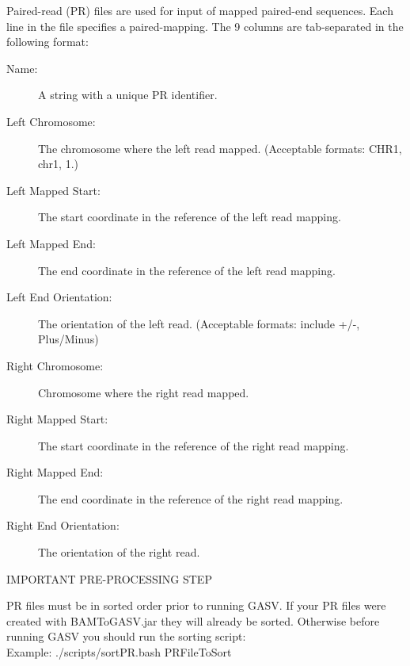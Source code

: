 \documentclass[11pt]{article}
\begin{document}
Paired-read (PR) files are used for input of mapped
paired-end sequences. Each line in the file specifies a paired-mapping.  The 9 columns are tab-separated in the following format:

\begin{framed}
\begin{description}
\item[Name:]                    A string with a unique PR identifier.

\item[Left Chromosome:]        The chromosome where the left read mapped.
                        (Acceptable formats: CHR1, chr1, 1.)

\item[Left Mapped Start:]      The start coordinate in the reference of the left read mapping.

\item[Left Mapped End:]       The end coordinate in the reference of the left read mapping.

\item[Left End Orientation:]  The orientation of the left read. (Acceptable
                        formats: include +/-, Plus/Minus)

\item[Right Chromosome:]       Chromosome where the right read mapped.

\item[Right Mapped Start:]     The start coordinate in the reference of the right read mapping.

\item[Right Mapped End:]      The end coordinate in the reference of the right read mapping.

\item[Right End Orientation:]  The orientation of the right read.
\end{description}
\end{framed}

\begin{framed}
\noindent \begin{center}IMPORTANT PRE-PROCESSING STEP \end{center}
PR files must be in sorted order prior to running GASV. If your PR files were created with BAMToGASV.jar they will already be sorted. Otherwise before running GASV you should run the sorting script:\\ 

\noindent Example: ./scripts/sortPR.bash PRFileToSort
\end{framed}
\end{document}
